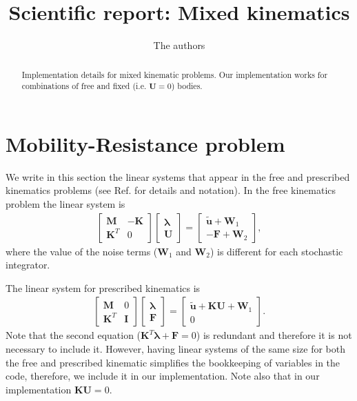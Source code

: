\documentclass[a4paper,12pt,twoside]{revtex4}
\newcommand{\eqn}{\begin{eqnarray}}
\newcommand{\eqnend}{\end{eqnarray}}
\newcommand{\bs}[1]{\boldsymbol{#1}}
\newcommand{\wtil}[1]{\widetilde{#1}}
\def\bF{\bs{F}}
\def\bI{\bs{I}}
\def\bK{\bs{K}}
\def\bM{\bs{M}}
\def\bu{\bs{u}}
\def\bU{\bs{U}}
\def\bW{\bs{W}}
\def\blambda{\bs{\lambda}}
\begin{document}
\title{Scientific report: Mixed kinematics}
\author{The authors}
\begin{abstract}
  Implementation details for mixed kinematic problems. Our implementation works for combinations of free and fixed
  (i.e. $\bU=0$) bodies. 
\end{abstract}

\maketitle





\section{Mobility-Resistance problem}
We write in this section the linear systems that appear in the free and prescribed kinematics problems (see Ref. \cite{Usabiaga2016} for details and notation). In the free kinematics problem the linear system is
\eqn
\left[ \begin{array}{cc}
\bM & -\bK \\
\bK^T & 0
\end{array}\right] 
\left[ \begin{array}{c}
\blambda \\
\bU
\end{array}\right] = 
\left[ \begin{array}{c}
\wtil{\bu} + \bW_1 \\
-\bF + \bW_2
\end{array}\right],
\label{eq:free}
\eqnend
where the value of the noise terms ($\bW_1$ and $\bW_2$) is different for each stochastic integrator.

The linear system for prescribed kinematics is
\eqn
\left[ \begin{array}{cc}
\bM & 0 \\
\bK^T & \bI
\end{array}\right] 
\left[ \begin{array}{c}
\blambda \\
\bF
\end{array}\right] = 
\left[ \begin{array}{c}
\wtil{\bu} + \bK \bU + \bW_1 \\
0
\end{array}\right].
\label{eq:prescribed}
\eqnend
Note that the second equation ($\bK^T \blambda + \bF = 0$) is redundant and therefore it is not necessary to include it. However,
having linear systems of the same size for both the free and prescribed kinematic simplifies the bookkeeping of variables in the code, therefore, we include it in our implementation.
Note also that in our implementation $\bK \bU=0$.
\end{document}
